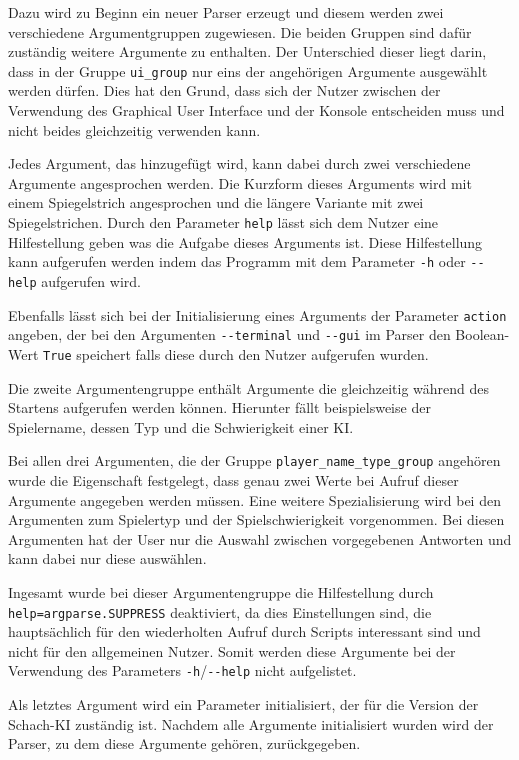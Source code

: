 Dazu wird zu Beginn ein neuer Parser erzeugt und diesem werden zwei
verschiedene Argumentgruppen zugewiesen. Die beiden Gruppen sind dafür
zuständig weitere Argumente zu enthalten. Der Unterschied dieser liegt
darin, dass in der Gruppe \texttt{ui\_group} nur eins der angehörigen
Argumente ausgewählt werden dürfen. Dies hat den Grund, dass sich der
Nutzer zwischen der Verwendung des Graphical User Interface und der
Konsole entscheiden muss und nicht beides gleichzeitig verwenden kann.

Jedes Argument, das hinzugefügt wird, kann dabei durch zwei verschiedene
Argumente angesprochen werden. Die Kurzform dieses Arguments wird mit
einem Spiegelstrich angesprochen und die längere Variante mit zwei
Spiegelstrichen. Durch den Parameter \texttt{help} lässt sich dem Nutzer
eine Hilfestellung geben was die Aufgabe dieses Arguments ist. Diese
Hilfestellung kann aufgerufen werden indem das Programm mit dem
Parameter \texttt{-h} oder \texttt{-\/-help} aufgerufen wird.

Ebenfalls lässt sich bei der Initialisierung eines Arguments der
Parameter \texttt{action} angeben, der bei den Argumenten
\texttt{-\/-terminal} und \texttt{-\/-gui} im Parser den Boolean-Wert
\texttt{True} speichert falls diese durch den Nutzer aufgerufen wurden.

Die zweite Argumentengruppe enthält Argumente die gleichzeitig während
des Startens aufgerufen werden können. Hierunter fällt beispielsweise
der Spielername, dessen Typ und die Schwierigkeit einer KI.

Bei allen drei Argumenten, die der Gruppe
\texttt{player\_name\_type\_group} angehören wurde die Eigenschaft
festgelegt, dass genau zwei Werte bei Aufruf dieser Argumente angegeben
werden müssen. Eine weitere Spezialisierung wird bei den Argumenten zum
Spielertyp und der Spielschwierigkeit vorgenommen. Bei diesen Argumenten
hat der User nur die Auswahl zwischen vorgegebenen Antworten und kann
dabei nur diese auswählen.

Ingesamt wurde bei dieser Argumentengruppe die Hilfestellung durch
\texttt{help=argparse.SUPPRESS} deaktiviert, da dies Einstellungen sind,
die hauptsächlich für den wiederholten Aufruf durch Scripts interessant
sind und nicht für den allgemeinen Nutzer. Somit werden diese Argumente
bei der Verwendung des Parameters \texttt{-h}/\texttt{-\/-help} nicht
aufgelistet.

Als letztes Argument wird ein Parameter initialisiert, der für die
Version der Schach-KI zuständig ist. Nachdem alle Argumente
initialisiert wurden wird der Parser, zu dem diese Argumente gehören,
zurückgegeben.

